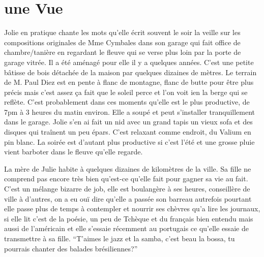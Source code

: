 \clearpage
\section*{une Vue}
Jolie en pratique chante les mots qu’elle écrit souvent le soir la veille sur les
compositions originales de Mme Cymbales dans son garage qui fait office de
chambre/tanière en regardant le fleuve qui se verse plus loin par la porte de
garage vitrée. Il a été aménagé pour elle il y a quelques années. C’est une
petite bâtisse de bois détachée de la maison par quelques dizaines de mètres.
Le terrain de M. Paul Diez est en pente à flanc de montagne, flanc de butte
pour être plus précis mais c’est assez ça fait que le soleil perce et l’on voit
ien la berge qui se reflète. C’est probablement dans ces moments qu’elle est
le plus productive, de 7pm à 3 heures du matin environ. Elle a  soupé et peut
s’installer tranquillement dans le garage. Jolie s’en ai fait un nid avec un
grand tapis un vieux sofa et des disques qui traînent un peu épars. C’est
relaxant comme endroit, du Valium en pin blanc.  La soirée est d’autant plus
productive si c’est l’été et une grosse pluie vient barboter dans le fleuve
qu’elle regarde. 

La mère de Julie habite à quelques dizaines de kilomètres de la ville. Sa fille
ne comprend pas encore très bien qu’est-ce qu’elle fait pour gagner sa vie au
fait. C’est un mélange bizarre de job, elle est boulangère à ses heures,
conseillère de ville à d’autres, on a eu ouï dire qu’elle a passée son barreau
autrefois pourtant elle passe plus de temps à contempler et nourrir ses chèvres
qu’a lire les journaux, si elle lit c’est de la poésie, un peu de Tchèque et du
français bien entendu mais aussi de l’américain et elle s’essaie récemment au
portugais ce qu’elle essaie de transmettre à sa fille. “T’aimes le jazz et la
samba, c’est beau la bossa, tu pourrais chanter des balades brésiliennes?”
